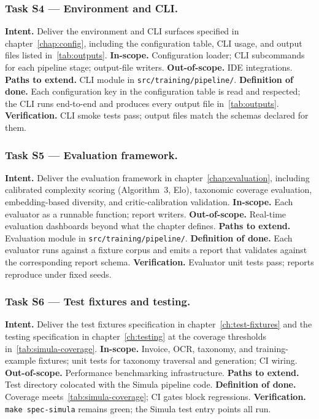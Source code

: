 \documentclass[12pt,a4paper,twoside]{report}
\begin{document}
\subsubsection{Task S4 --- Environment and CLI.}
\textbf{Intent.} Deliver the environment and CLI surfaces specified
in chapter~\ref{chap:config}, including the configuration table, CLI
usage, and output files listed in~\ref{tab:outputs}.
\textbf{In-scope.} Configuration loader; CLI subcommands for each
pipeline stage; output-file writers.
\textbf{Out-of-scope.} IDE integrations.
\textbf{Paths to extend.} CLI module in
\texttt{src/training/pipeline/}.
\textbf{Definition of done.} Each configuration key in the
configuration table is read and respected; the CLI runs end-to-end
and produces every output file in~\ref{tab:outputs}.
\textbf{Verification.} CLI smoke tests pass; output files match the
schemas declared for them.

\subsubsection{Task S5 --- Evaluation framework.}
\textbf{Intent.} Deliver the evaluation framework in
chapter~\ref{chap:evaluation}, including calibrated complexity
scoring (Algorithm~3, Elo), taxonomic coverage evaluation,
embedding-based diversity, and critic-calibration validation.
\textbf{In-scope.} Each evaluator as a runnable function; report
writers.
\textbf{Out-of-scope.} Real-time evaluation dashboards beyond what
the chapter defines.
\textbf{Paths to extend.} Evaluation module in
\texttt{src/training/pipeline/}.
\textbf{Definition of done.} Each evaluator runs against a fixture
corpus and emits a report that validates against the corresponding
report schema.
\textbf{Verification.} Evaluator unit tests pass; reports reproduce
under fixed seeds.

\subsubsection{Task S6 --- Test fixtures and testing.}
\textbf{Intent.} Deliver the test fixtures specification in
chapter~\ref{ch:test-fixtures} and the testing specification in
chapter~\ref{ch:testing} at the coverage thresholds
in~\ref{tab:simula-coverage}.
\textbf{In-scope.} Invoice, OCR, taxonomy, and training-example
fixtures; unit tests for taxonomy traversal and generation; CI
wiring.
\textbf{Out-of-scope.} Performance benchmarking infrastructure.
\textbf{Paths to extend.} Test directory colocated with the Simula
pipeline code.
\textbf{Definition of done.} Coverage meets~\ref{tab:simula-coverage};
CI gates block regressions.
\textbf{Verification.} \texttt{make spec-simula} remains green; the
Simula test entry points all run.
\end{document}
